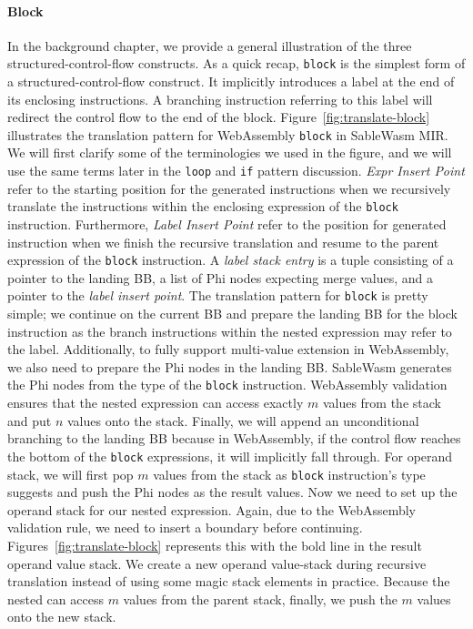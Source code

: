 \paragraph{Block}
In the background chapter, we provide a general illustration of the three structured-control-flow constructs.  As a quick recap, \texttt{block} is the simplest form of a structured-control-flow construct. It implicitly introduces a label at the end of its enclosing instructions. A branching instruction referring to this label will redirect the control flow to the end of the block. Figure~\ref{fig:translate-block} illustrates the translation pattern for WebAssembly \texttt{block} in SableWasm MIR.  We will first clarify some of the terminologies we used in the figure, and we will use the same terms later in the \texttt{loop} and \texttt{if} pattern discussion. \emph{Expr Insert Point} refer to the starting position for the generated instructions when we recursively translate the instructions within the enclosing expression of the \texttt{block} instruction. Furthermore, \emph{Label Insert Point} refer to the position for generated instruction when we finish the recursive translation and resume to the parent expression of the \texttt{block} instruction. A \emph{label stack entry} is a tuple consisting of a pointer to the landing BB, a list of Phi nodes expecting merge values, and a pointer to the \emph{label insert point}. The translation pattern for \texttt{block} is pretty simple; we continue on the current BB and prepare the landing BB for the block instruction as the branch instructions within the nested expression may refer to the label. Additionally, to fully support multi-value extension in WebAssembly, we also need to prepare the Phi nodes in the landing BB. SableWasm generates the Phi nodes from the type of the \texttt{block} instruction. WebAssembly validation ensures that the nested expression can access exactly $m$ values from the stack and put $n$ values onto the stack. Finally, we will append an unconditional branching to the landing BB because in WebAssembly, if the control flow reaches the bottom of the \texttt{block} expressions, it will implicitly fall through. For operand stack, we will first pop $m$ values from the stack as \texttt{block} instruction's type suggests and push the Phi nodes as the result values. Now we need to set up the operand stack for our nested expression. Again, due to the WebAssembly validation rule, we need to insert a boundary before continuing. Figures~\ref{fig:translate-block} represents this with the bold line in the result operand value stack. We create a new operand value-stack during recursive translation instead of using some magic stack elements in practice.  Because the nested can access $m$ values from the parent stack, finally, we push the $m$ values onto the new stack.


